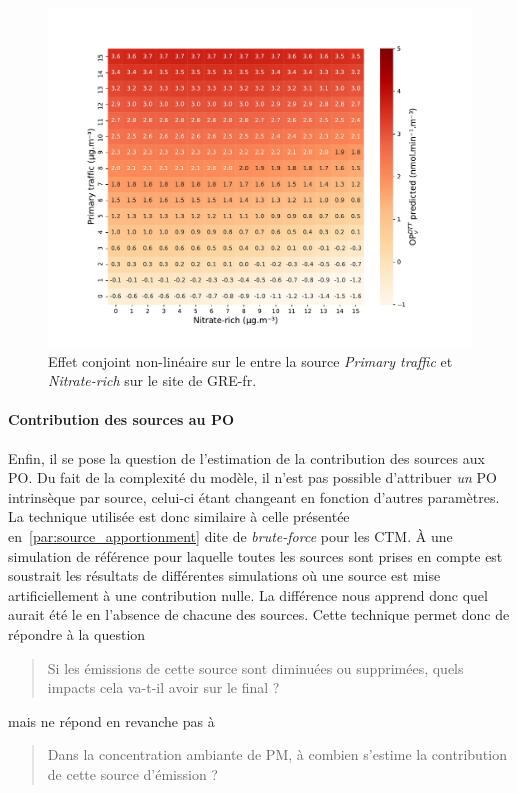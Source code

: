 \begin{figure}[ht]
    \centering
    \includegraphics[width=0.8\linewidth]{figures/chapter05/coktail_Primary traffic_Nitrate-rich.pdf}
    \caption{Effet conjoint non-linéaire sur le \PODTTv{} entre la source \textit{Primary
    traffic} et \textit{Nitrate-rich} sur le site de GRE-fr.}%
    \label{fig:figures/chapter05/coktail_Primary traffic_Nitrate-rich}
\end{figure}

\paragraph{Contribution des sources au PO}%
\label{par:contribution_des_sources_au_po}

Enfin, il se pose la question de l'estimation de la contribution des sources aux PO. Du
fait de la complexité du modèle, il n'est pas possible d'attribuer \emph{un} PO
intrinsèque par source, celui-ci étant changeant en fonction d'autres paramètres.
La technique utilisée est donc similaire à celle présentée
en~\ref{par:source_apportionment} dite de \textit{brute-force} pour les CTM. À une
simulation de référence pour laquelle toutes les sources sont prises en compte est
soustrait les résultats de différentes simulations où une source est mise artificiellement à une
contribution nulle.  La différence nous apprend donc quel aurait été le \POv{} en
l'absence de chacune des sources.
Cette technique permet donc de répondre à la question
\begin{quote}
   Si les émissions de cette source sont diminuées ou supprimées, quels impacts cela va-t-il
   avoir sur le \POv{} final ?
\end{quote}
mais ne répond en revanche pas à
\begin{quote}
   Dans la concentration ambiante de PM, à combien s'estime la contribution de cette source
   d'émission ?
\end{quote}


